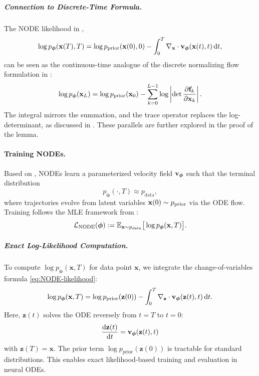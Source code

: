 

\subparagraph{Connection to Discrete-Time Formula.}  
The NODE likelihood in ,
\[
\log p_{\bm{\phi}}({\mathbf{x}}(T), T) = \log p_{\text{prior}}({\mathbf{x}}(0), 0) - \int_0^T \nabla_{\mathbf{x}} \cdot {\mathbf{v}}_{\bm{\phi}}({\mathbf{x}}(t), t) \mathop{}\!\mathrm{d} t,
\]
can be seen as the continuous-time analogue of the discrete normalizing flow formulation in :
\[
\log p_{\bm{\phi}}({\mathbf{x}}_L) = \log p_{\text{prior}}({\mathbf{x}}_0) - \sum_{k=0}^{L-1} \log \left| \det \frac{\partial {\mathbf{f}}_k}{\partial {\mathbf{x}}_k} \right|.
\]
The integral mirrors the summation, and the trace operator replaces the log-determinant, as discussed in . These parallels are further explored in the proof of the lemma.

\paragraph{Training NODEs.}  
Based on , NODEs learn a parameterized velocity field ${\mathbf{v}}_{\bm{\phi}}$ such that the terminal distribution
\[
p_{\bm{\phi}}(\cdot, T) \approx p_{\text{data}},
\]
where trajectories evolve from latent variables ${\mathbf{x}}(0) \sim p_{\text{prior}}$ via the ODE flow. Training follows the MLE framework from :
\[
\mathcal{L}_{\text{NODE}}(\bm{\phi}) := \mathbb{E}_{{\mathbf{x}} \sim p_{\text{data}}} \big[\log p_{\bm{\phi}}({\mathbf{x}}, T)\big].
\]

\subparagraph{Exact Log-Likelihood Computation.} 
To compute $\log p_{\bm{\phi}}(\mathbf{x}, T)$ for data point $\mathbf{x}$, we integrate the change-of-variables formula \eqref{eq:NODE-likelihood}:
\begin{align}
\log p_{\bm{\phi}}(\mathbf{x}, T) = \log p_{\text{prior}}(\mathbf{z}(0)) - \int_0^T \nabla_{\mathbf{z}} \cdot \mathbf{v}_{\bm{\phi}}(\mathbf{z}(t), t) \mathop{}\!\mathrm{d} t.
\end{align}
Here, $\mathbf{z}(t)$ solves the ODE reversely from $t = T$ to $t = 0$:
\[
\frac{\mathop{}\!\mathrm{d}\mathbf{z}(t)}{\mathop{}\!\mathrm{d} t} = \mathbf{v}_{\bm{\phi}}(\mathbf{z}(t), t)
\]
with $\mathbf{z}(T) = \mathbf{x}$. The prior term $\log p_{\text{prior}}(\mathbf{z}(0))$ is tractable for standard distributions. This enables exact likelihood-based training and evaluation in neural ODEs.

